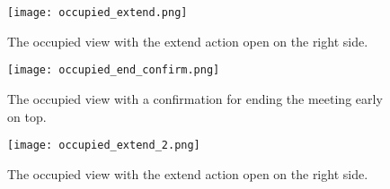   \begin{figure}[h!]
    \centering
    \texttt{[image: occupied\_extend.png]}
    \caption{The occupied view with the extend action open on the right side.}
    \label{fig:occupied_extend}
  \end{figure}

  \begin{figure}[h!]
    \centering
    \texttt{[image: occupied\_end\_confirm.png]}
    \caption{The occupied view with a confirmation for ending the meeting early on top.}
    \label{fig:occupied_end}
  \end{figure}

  \begin{figure}[h!]
    \centering
    \texttt{[image: occupied\_extend\_2.png]}
    \caption{The occupied view with the extend action open on the right side.}
    \label{fig:occupied_extend2}
  \end{figure}

